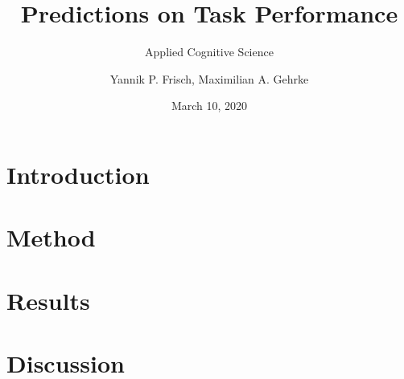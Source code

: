 \documentclass[
pdfa=false,  %
color=9c,
logo=body,
class=article,
logofile=../logos/tuda_logo.pdf
]{tudapub}
\author{Yannik P. Frisch, Maximilian A. Gehrke}
\title{Predictions on Task Performance}
\date{March 10, 2020}
\subtitle{Applied Cognitive Science}
\begin{document}
\maketitle

\begin{abstract}
	\lipsum
\end{abstract}

\section{Introduction}
	

\section{Method}
	

\section{Results}
	

\section{Discussion}
	
\end{document}
